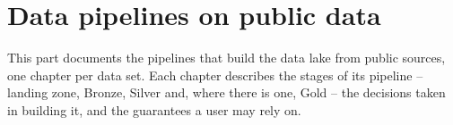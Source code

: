 \documentclass[a4paper, 11pt]{report}
\begin{document}


\part{Data pipelines on public data\label{part:basic-data-lake}}

This part documents the pipelines that build the data lake from public sources, one chapter per data set. Each chapter describes the stages of its pipeline -- landing zone, Bronze, Silver and, where there is one, Gold -- the decisions taken in building it, and the guarantees a user may rely on.
























\printbibliography
\end{document}
